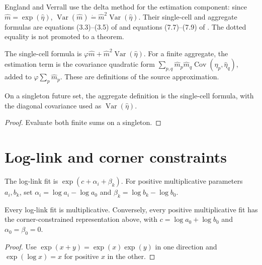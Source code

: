 England and Verrall use the delta method for the estimation component: since
$\widehat m=\exp(\widehat\eta)$,
$\operatorname{Var}(\widehat m)\mathrel{\dot=}\widehat m^2
\operatorname{Var}(\widehat\eta)$. Their single-cell and aggregate formulas are equations
(3.3)--(3.5) of \cite{EnglandVerrall1999} and equations (7.7)--(7.9) of
\cite{EnglandVerrall2002}. The dotted equality is not promoted to a theorem.

\begin{definition}\label{def:odpGlmMsep}\leanok
The single-cell formula is
$\varphi\widehat m+\widehat m^2\operatorname{Var}(\widehat\eta)$.
For a finite aggregate, the estimation term is the covariance quadratic form
$\sum_{p,q}\widehat m_p\widehat m_q\operatorname{Cov}(\widehat\eta_p,\widehat\eta_q)$,
added to $\varphi\sum_p\widehat m_p$.
These are definitions of the source approximation.
\end{definition}

\begin{lemma}\label{lem:odpGlmSingleton}\leanok
{}
On a singleton future set, the aggregate definition is the single-cell formula, with the
diagonal covariance used as $\operatorname{Var}(\widehat\eta)$.
\end{lemma}
\begin{proof}\leanok Evaluate both finite sums on a singleton. \end{proof}

\section{Log-link and corner constraints}

\begin{definition}\label{def:odpLogLink}\leanok
The log-link fit is $\exp(c+\alpha_i+\beta_k)$. For positive multiplicative parameters
$a_i,b_k$, set
$\alpha_i=\log a_i-\log a_0$ and $\beta_k=\log b_k-\log b_0$.
\end{definition}

\begin{theorem}\label{thm:odpLogLink}\leanok
{}
Every log-link fit is multiplicative. Conversely, every positive multiplicative fit has the
corner-constrained representation above, with $c=\log a_0+\log b_0$ and
$\alpha_0=\beta_0=0$.
\end{theorem}
\begin{proof}\leanok Use $\exp(x+y)=\exp(x)\exp(y)$ in one direction and
$\exp(\log x)=x$ for positive $x$ in the other. \end{proof}

